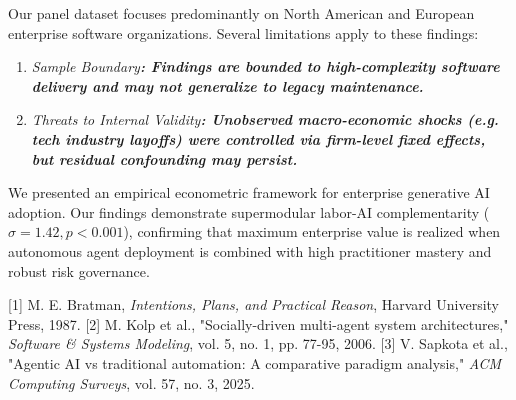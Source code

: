 \documentclass[10pt,twocolumn,letterpaper]{article}
\begin{document}
Our panel dataset focuses predominantly on North American and European enterprise software organizations. Several limitations apply to these findings:
\begin{enumerate}
  \item \textit{Sample Boundary\textbf{: Findings are bounded to high-complexity software delivery and may not generalize to legacy maintenance.}}
  \item \textit{Threats to Internal Validity\textbf{: Unobserved macro-economic shocks (e.g. tech industry layoffs) were controlled via firm-level fixed effects, but residual confounding may persist.}}
\end{enumerate}



We presented an empirical econometric framework for enterprise generative AI adoption. Our findings demonstrate supermodular labor-AI complementarity ($\sigma = 1.42, p < 0.001$), confirming that maximum enterprise value is realized when autonomous agent deployment is combined with high practitioner mastery and robust risk governance. \cite{crossref_10_2139_ssrn_6374778}


[1] M. E. Bratman, \textit{Intentions, Plans, and Practical Reason}, Harvard University Press, 1987.
[2] M. Kolp et al., "Socially-driven multi-agent system architectures," \textit{Software \& Systems Modeling}, vol. 5, no. 1, pp. 77-95, 2006.
[3] V. Sapkota et al., "Agentic AI vs traditional automation: A comparative paradigm analysis," \textit{ACM Computing Surveys}, vol. 57, no. 3, 2025.


\par\vspace{0.5em}



\end{document}
